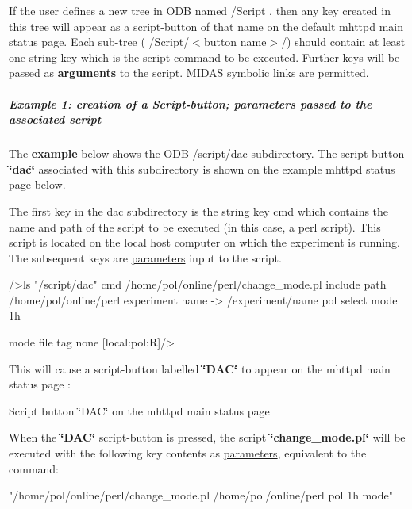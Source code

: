 \par
 If the user defines a new tree in ODB named /Script , then any key created in this tree will appear as a script-\/button of that name on the default mhttpd main status page. Each sub-\/tree ( /Script/$<$button name$>$/) should contain at least one string key which is the script command to be executed. Further keys will be passed as {\bfseries  arguments } to the script. MIDAS symbolic links are permitted.\hypertarget{RC_mhttpd_defining_script_buttons_RC_odb_script_example1}{}\subparagraph{Example 1: creation of a Script-\/button; parameters passed to the associated script}\label{RC_mhttpd_defining_script_buttons_RC_odb_script_example1}
The {\bfseries  example } below shows the ODB /script/dac subdirectory. The script-\/button {\bfseries \char`\"{}dac\char`\"{}} associated with this subdirectory is shown on the example mhttpd status page below.

The first key in the dac subdirectory is the string key cmd which contains the name and path of the script to be executed (in this case, a perl script). This script is located on the local host computer on which the experiment is running. The subsequent keys are \hyperlink{structparameters}{parameters} input to the script. 
\begin{DoxyCode}
/>ls "/script/dac"
cmd                             /home/pol/online/perl/change_mode.pl
include path                    /home/pol/online/perl
experiment name -> /experiment/name
                                pol
select mode                     1h

mode file tag                   none
[local:pol:R]/>  
\end{DoxyCode}


This will cause a script-\/button labelled {\bfseries \char`\"{}DAC\char`\"{}} to appear on the mhttpd main status page : \par
 \begin{center} Script button \char`\"{}DAC\char`\"{} on the mhttpd main status page  \end{center} \par


When the {\bfseries \char`\"{}DAC\char`\"{}} script-\/button is pressed, the script {\bfseries \char`\"{}change\_\-mode.pl\char`\"{}} will be executed with the following key contents as \hyperlink{structparameters}{parameters}, equivalent to the command: 
\begin{DoxyCode}
  "/home/pol/online/perl/change_mode.pl  /home/pol/online/perl pol 1h mode"
\end{DoxyCode}
 \par


